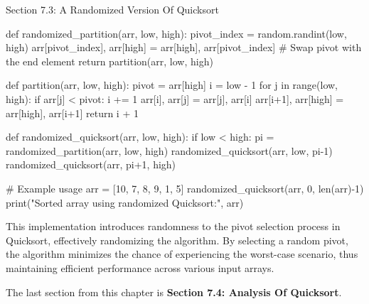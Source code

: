 \begin{notes}{Section 7.3: A Randomized Version Of Quicksort}
\begin{highlight}
\begin{code}[Python]
    def randomized_partition(arr, low, high):
        pivot_index = random.randint(low, high)
        arr[pivot_index], arr[high] = arr[high], arr[pivot_index]  # Swap pivot with the end element
        return partition(arr, low, high)
    
    def partition(arr, low, high):
        pivot = arr[high]
        i = low - 1
        for j in range(low, high):
            if arr[j] < pivot:
                i += 1
                arr[i], arr[j] = arr[j], arr[i]
        arr[i+1], arr[high] = arr[high], arr[i+1]
        return i + 1
    
    def randomized_quicksort(arr, low, high):
        if low < high:
            pi = randomized_partition(arr, low, high)
            randomized_quicksort(arr, low, pi-1)
            randomized_quicksort(arr, pi+1, high)
    
    # Example usage
    arr = [10, 7, 8, 9, 1, 5]
    randomized_quicksort(arr, 0, len(arr)-1)
    print("Sorted array using randomized Quicksort:", arr)
    \end{code}
        
        This implementation introduces randomness to the pivot selection process in Quicksort, effectively randomizing the algorithm. By selecting a random pivot, the algorithm minimizes the chance 
        of experiencing the worst-case scenario, thus maintaining efficient performance across various input arrays.
    \end{highlight}    
\end{notes}

The last section from this chapter is \textbf{Section 7.4: Analysis Of Quicksort}.


